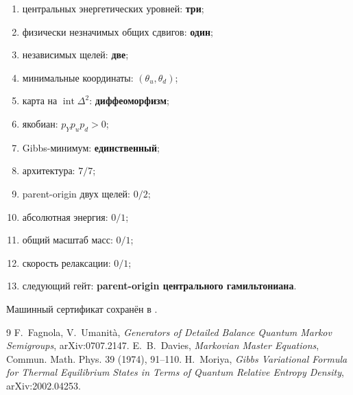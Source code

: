\begin{protocol}\begin{enumerate}
\item центральных энергетических уровней: \textbf{три};
\item физически незначимых общих сдвигов: \textbf{один};
\item независимых щелей: \textbf{две};
\item минимальные координаты: \textbf{$(\theta_u,\theta_d)$};
\item карта на $\operatorname{int}\Delta^2$: \textbf{диффеоморфизм};
\item якобиан: \textbf{$p_Yp_up_d>0$};
\item Gibbs-минимум: \textbf{единственный};
\item архитектура: \textbf{$7/7$};
\item parent-origin двух щелей: \textbf{$0/2$};
\item абсолютная энергия: \textbf{$0/1$};
\item общий масштаб масс: \textbf{$0/1$};
\item скорость релаксации: \textbf{$0/1$};
\item следующий гейт: \textbf{parent-origin центрального гамильтониана}.
\end{enumerate}\end{protocol}

Машинный сертификат сохранён в
.

\begin{thebibliography}{9}
F.~Fagnola, V.~Umanit\`a,
\emph{Generators of Detailed Balance Quantum Markov Semigroups},
arXiv:0707.2147.
E.~B.~Davies,
\emph{Markovian Master Equations}, Commun. Math. Phys. 39 (1974), 91--110.
H.~Moriya,
\emph{Gibbs Variational Formula for Thermal Equilibrium States in Terms of
Quantum Relative Entropy Density}, arXiv:2002.04253.
\end{thebibliography}